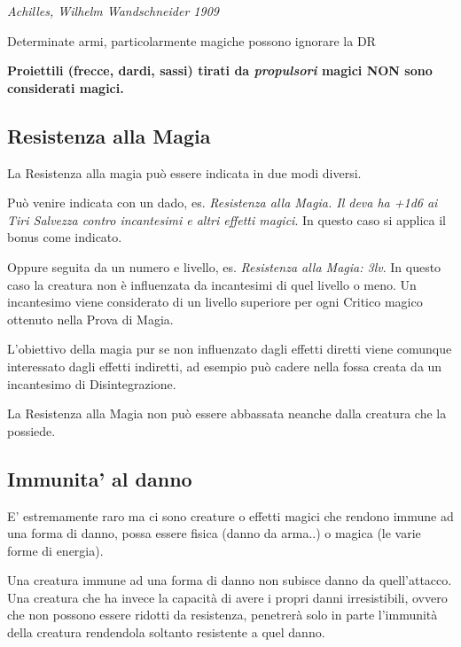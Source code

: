 \begin{multicols}{2}
\begin{center}
\emph{Achilles, Wilhelm Wandschneider 1909}

\end{center}

Determinate armi, particolarmente magiche possono ignorare la DR 

\medskip

\textbf{Proiettili (frecce, dardi, sassi) tirati da \emph{propulsori} magici NON sono considerati magici.}

\subsection{Resistenza alla Magia}\label{resistenzaallamagia}

La Resistenza alla magia può essere indicata in due modi diversi.

Può venire indicata con un dado, es. \emph{Resistenza alla Magia. Il deva ha +1d6 ai Tiri Salvezza contro incantesimi e altri effetti magici}. In questo caso si applica il bonus come indicato.

Oppure seguita da un numero e livello, es. \emph{Resistenza alla Magia: 3lv}. In questo caso la creatura non è influenzata da incantesimi di quel livello o meno. Un incantesimo viene considerato di un livello superiore per ogni Critico magico ottenuto nella Prova di Magia.

L'obiettivo della magia pur se non influenzato dagli effetti diretti viene comunque interessato dagli effetti indiretti, ad esempio può cadere nella fossa creata da un incantesimo di Disintegrazione.

La Resistenza alla Magia non può essere abbassata neanche dalla creatura che la possiede.

\subsection{Immunita' al danno}\label{immunitaaldanno}

E' estremamente raro ma ci sono creature o effetti magici che rendono immune ad una forma di danno, possa essere fisica (danno da arma..) o magica (le varie forme di energia).

Una creatura immune ad una forma di danno non subisce danno da quell'attacco. Una creatura che ha invece la capacità di avere i propri danni irresistibili, ovvero che non possono essere ridotti da resistenza, penetrerà solo in parte l'immunità della creatura rendendola soltanto resistente a quel danno.


\end{multicols}
